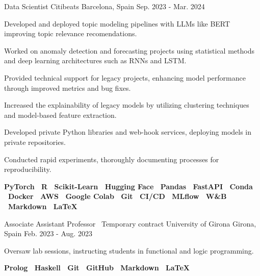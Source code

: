 

\begin{cventries}


  \cventry
  {Data Scientist} %
  {Citibeats} %
  {Barcelona, Spain} %
  {Sep. 2023 - Mar. 2024} %
  {
  \begin{cvitems}
    \item {Developed and deployed topic modeling pipelines with LLMs like BERT improving topic relevance recomendations.}
    \item {Worked on anomaly detection and forecasting projects using statistical methods and deep learning architectures
      such as RNNs and LSTM.}
    \item {Provided technical support for legacy projects, enhancing model performance through improved metrics and bug fixes.}
    \item {Increased the explainability of legacy models by utilizing clustering techniques and model-based feature extraction.}
    \item {Developed private Python libraries and web-hook services, deploying models in private repositories.}
    \item {Conducted rapid experiments, thoroughly documenting processes for reproducibility.}
    \item {
      \textbf{
        PyTorch \textbar \
        R \textbar \
        Scikit-Learn \textbar \
        Hugging Face \textbar \
        Pandas \textbar \
        FastAPI \textbar \
        Conda \textbar \
        Docker \textbar \
        AWS \textbar \
        Google Colab \textbar \
        Git \textbar \
        CI/CD \textbar \
        MLflow \textbar \
        W\&B \textbar \
        Markdown \textbar \
        \LaTeX
     }
    }
  \end{cvitems}
}


  \cventry
  {Associate Assistant Professor \cdotp \ Temporary contract} %
  {University of Girona} %
  {Girona, Spain} %
  {Feb. 2023 - Aug. 2023} %
  {
    \begin{cvitems} %
    \item {Oversaw lab sessions, instructing students in functional and logic programming.}
    \item {
      \textbf{
        Prolog \textbar \
        Haskell \textbar \
        Git \textbar \
        GitHub \textbar \
        Markdown \textbar \
        \LaTeX
     }
    }
    \end{cvitems}
    }


\end{cventries}
